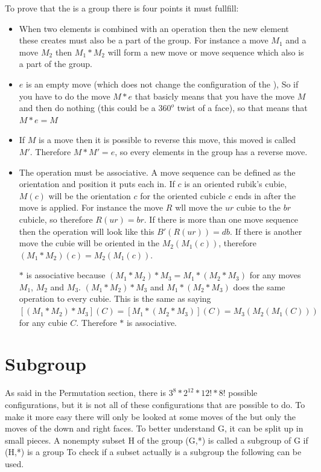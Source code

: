 To prove that the \rubik{} is a group there is four points it must fullfill:

\begin {itemize}
\item When two elements is combined with an operation then the new element these creates must also be a part of the group. For instance a move $M_1$ and a move $M_2$ then $M_1 * M_2$ will form a new move or move sequence which also is a part of the group.

\item $e$ is an empty move (which does not change the configuration of the \rubik{}), So if you have to do the move $M * e$ that basicly means that you have the move $M$ and then do nothing (this could be a $360^o$ twist of a face), so that means that $M*e=M$

\item If $M$ is a move then it is possible to reverse this move, this moved is called $M'$. Therefore $M*M' = e$, so every elements in the group has a reverse move.

\item The operation must be associative. A move sequence can be defined as the orientation and position it puts each \cpiece{} in. If $c$ is an oriented rubik's cubie, $M(c)$ will be the orientation $c$ for the oriented cubicle $c$ ends in after the move is applied. For instance the move $R$ wll move the $ur$ cubie to the $br$ cubicle, so therefore $R(ur)=br$. If there is more than one move sequence then the operation will look like this $B'(R(ur))=db$. If there is another move the cubie will be oriented in the $M_2 (M_1 (c))$, therefore $(M_1 *M_2 )(c)=M_2 (M_1 (c))$. 

$*$ is associative  because $(M_1 *M_2 )*M_3 = M_1 *(M_2 *M_3 )$ for any moves $M_1$, $M_2$ and $M_3$. $(M_1 *M_2 )*M_3$ and $M_1 *(M_2 *M_3 )$ does the same operation to every cubie. This is the same as saying $[(M_1 *M_2 )*M_3 ](C)=[M_1 *(M_2 *M_3 )](C)=M_3 (M_2 (M_1 (C)))$ for any cubie $C$. Therefore $*$ is associative.

\end {itemize}

\section{Subgroup}
As said in the Permutation section, there is $3^8*2^{12}*12!*8!$ possible configurations, but it is not all of these configurations that are possible to do.  To make it more easy there will only be looked at some moves of the \rubik{} but only the moves of the down and right faces. To better understand G, it can be split up in small pieces.
A nonempty subset H of the group (G,*) is called a subgroup of G if (H,*) is a group
To check if a subset actually is a subgroup the following can be used.


